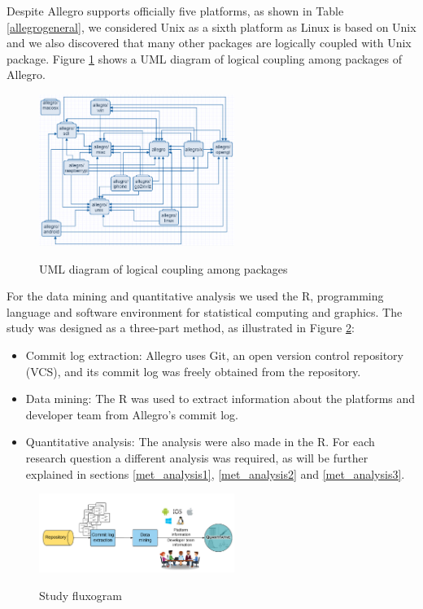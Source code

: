 \documentclass[10pt, conference]{IEEEtran}
\begin{document}
Despite Allegro supports officially five platforms, as shown in Table \ref{allegrogeneral}, we considered Unix as a sixth platform as Linux is based on Unix and we also discovered that many other packages are logically coupled with Unix package. Figure \ref{diagrama} shows a UML diagram of logical coupling among packages of Allegro. 

\begin{figure}[h]
\centering
\textbf{}\includegraphics[width=2.5in]{diagrama}
\caption{UML diagram of logical coupling among packages}
\label{diagrama}
\end{figure} 

For the data mining and quantitative analysis we used the R, programming language and software environment for statistical computing and graphics. The study was designed as a three-part method, as illustrated in Figure \ref{metodologia}: 

\begin{itemize}
\item Commit log extraction: Allegro uses Git, an open version control repository (VCS), and its commit log was freely obtained from the repository.
\item  Data mining: The R was used to extract information about the platforms and developer team from Allegro's commit log. 
\item Quantitative analysis: The analysis were also made in the R. For each research question a different analysis was required, as will be further explained in sections \ref{met_analysis1}, \ref{met_analysis2} and \ref{met_analysis3}.
\end{itemize}

\begin{figure}[h]
\centering
\textbf{}\includegraphics[width=2.5in]{metodologia}
\caption{Study fluxogram}
\label{metodologia}
\end{figure}
\end{document}
